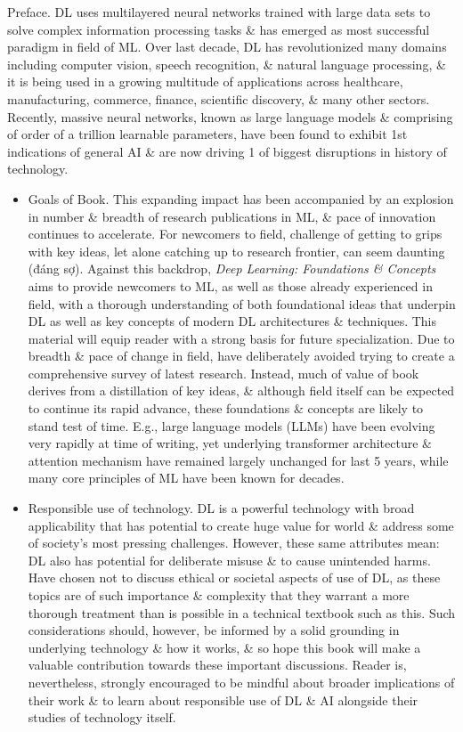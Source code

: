 \documentclass{article}
\begin{document}
{\sf Preface.} DL uses multilayered neural networks trained with large data sets to solve complex information processing tasks \& has emerged as most successful paradigm in field of ML. Over last decade, DL has revolutionized many domains including computer vision, speech recognition, \& natural language processing, \& it is being used in a growing multitude of applications across healthcare, manufacturing, commerce, finance, scientific discovery, \& many other sectors. Recently, massive neural networks, known as large language models \& comprising of order of a trillion learnable parameters, have been found to exhibit 1st indications of general AI \& are now driving 1 of biggest disruptions in history of technology.
\begin{itemize}
	\item {\sf Goals of Book.} This expanding impact has been accompanied by an explosion in number \& breadth of research publications in ML, \& pace of innovation continues to accelerate. For newcomers to field, challenge of getting to grips with key ideas, let alone catching up to research frontier, can seem daunting (đáng sợ). Against this backdrop, {\it Deep Learning: Foundations \& Concepts} aims to provide newcomers to ML, as well as those already experienced in field, with a thorough understanding of both foundational ideas that underpin DL as well as key concepts of modern DL architectures \& techniques. This material will equip reader with a strong basis for future specialization. Due to breadth \& pace of change in field, have deliberately avoided trying to create a comprehensive survey of latest research. Instead, much of value of book derives from a distillation of key ideas, \& although field itself can be expected to continue its rapid advance, these foundations \& concepts are likely to stand test of time. E.g., large language models (LLMs) have been evolving very rapidly at time of writing, yet underlying transformer architecture \& attention mechanism have remained largely unchanged for last 5 years, while many core principles of ML have been known for decades.
	\item {\sf Responsible use of technology.} DL is a powerful technology with broad applicability that has potential to create huge value for world \& address some of society's most pressing challenges. However, these same attributes mean: DL also has potential for deliberate misuse \& to cause unintended harms. Have chosen not to discuss ethical or societal aspects of use of DL, as these topics are of such importance \& complexity that they warrant a more thorough treatment than is possible in a technical textbook such as this. Such considerations should, however, be informed by a solid grounding in underlying technology \& how it works, \& so hope this book will make a valuable contribution towards these important discussions. Reader is, nevertheless, strongly encouraged to be mindful about broader implications of their work \& to learn about responsible use of DL \& AI alongside their studies of technology itself.

\end{itemize}
\end{document}
